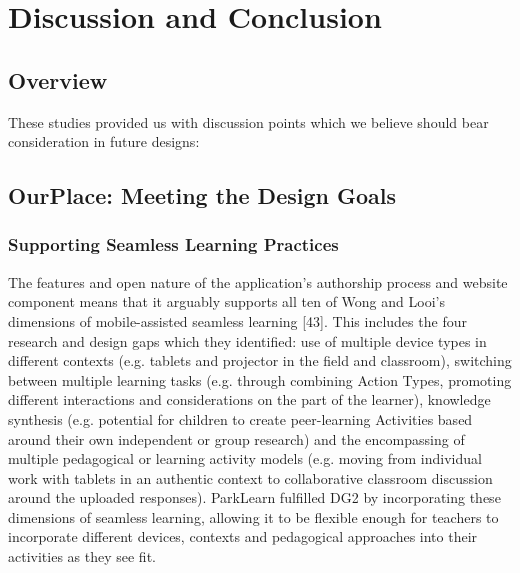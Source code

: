 \chapter{Discussion and Conclusion}

\section{Overview}

These studies provided us with discussion points which we believe should bear consideration in future designs:

\section{OurPlace: Meeting the Design Goals}

\subsection{Supporting Seamless Learning Practices}

The features and open nature of the application’s authorship process and website
component means that it arguably supports all ten of Wong and Looi’s dimensions
of mobile-assisted seamless learning [43].  This includes the four research and
design gaps which they identified: use of multiple device types in different
contexts (e.g. tablets and projector in the field and classroom), switching
between multiple learning tasks (e.g. through combining Action Types, promoting
different interactions and considerations on the part of the learner), knowledge
synthesis (e.g. potential for children to create peer-learning Activities based
around their own independent or group research) and the encompassing of multiple
pedagogical or learning activity models (e.g. moving from individual work with
tablets in an authentic context to collaborative classroom discussion around the
uploaded responses). ParkLearn fulfilled DG2 by incorporating these dimensions
of seamless learning, allowing it to be flexible enough for teachers to
incorporate different devices, contexts and pedagogical approaches into their
activities as they see fit.
  
